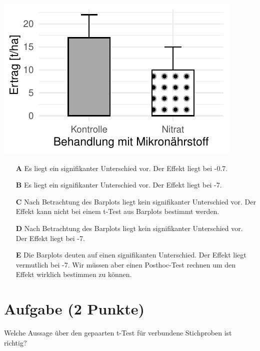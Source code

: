 \documentclass[a4paper, 9pt]{scrartcl}\usepackage[]{graphicx}\usepackage[]{xcolor}
\makeatletter
\def\maxwidth{ %
  \ifdim\Gin@nat@width>\linewidth
    \linewidth
  \else
    \Gin@nat@width
  \fi
}
\makeatother
\begin{document}
{\centering \includegraphics[width=\maxwidth]{img/mc-testing-ttest-02-1} 

}







\begin{enumerate}
\item [\textbf{A} \msquare] Es liegt ein signifikanter Unterschied vor. Der Effekt liegt bei -0.7.
\item [\textbf{B} \msquare] Es liegt ein signifikanter Unterschied vor. Der Effekt liegt bei -7.
\item [\textbf{C} \msquare] Nach Betrachtung des Barplots liegt kein signifikanter Unterschied vor. Der Effekt kann nicht bei einem t-Test aus Barplots bestimmt werden.
\item [\textbf{D} \msquare] Nach Betrachtung des Barplots liegt kein signifikanter Unterschied vor. Der Effekt liegt bei -7.
\item [\textbf{E} \msquare] Die Barplots deuten auf einen signifikanten Unterschied. Der Effekt liegt vermutlich bei -7. Wir müssen aber einen Posthoc-Test rechnen um den Effekt wirklich bestimmen zu können.
\end{enumerate}

\section{Aufgabe \hfill (2 Punkte)}




Welche Aussage über den gepaarten t-Test für verbundene Stichproben ist richtig?
\end{document}
